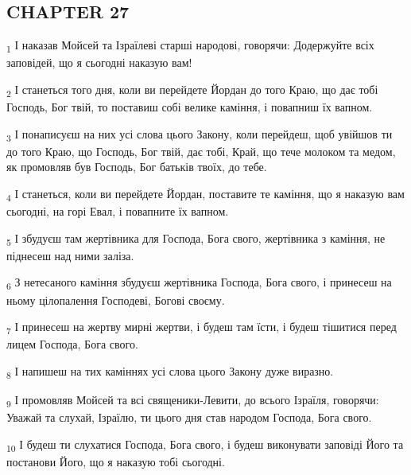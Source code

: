 \subsection{CHAPTER 27}
\begin{tcolorbox}
\textsubscript{1} І наказав Мойсей та Ізраїлеві старші народові, говорячи: Додержуйте всіх заповідей, що я сьогодні наказую вам!
\end{tcolorbox}
\begin{tcolorbox}
\textsubscript{2} І станеться того дня, коли ви перейдете Йордан до того Краю, що дає тобі Господь, Бог твій, то поставиш собі велике каміння, і повапниш їх вапном.
\end{tcolorbox}
\begin{tcolorbox}
\textsubscript{3} І понаписуєш на них усі слова цього Закону, коли перейдеш, щоб увійшов ти до того Краю, що Господь, Бог твій, дає тобі, Край, що тече молоком та медом, як промовляв був Господь, Бог батьків твоїх, до тебе.
\end{tcolorbox}
\begin{tcolorbox}
\textsubscript{4} І станеться, коли ви перейдете Йордан, поставите те каміння, що я наказую вам сьогодні, на горі Евал, і повапните їх вапном.
\end{tcolorbox}
\begin{tcolorbox}
\textsubscript{5} І збудуєш там жертівника для Господа, Бога свого, жертівника з каміння, не піднесеш над ними заліза.
\end{tcolorbox}
\begin{tcolorbox}
\textsubscript{6} З нетесаного каміння збудуєш жертівника Господа, Бога свого, і принесеш на ньому цілопалення Господеві, Богові своєму.
\end{tcolorbox}
\begin{tcolorbox}
\textsubscript{7} І принесеш на жертву мирні жертви, і будеш там їсти, і будеш тішитися перед лицем Господа, Бога свого.
\end{tcolorbox}
\begin{tcolorbox}
\textsubscript{8} І напишеш на тих каміннях усі слова цього Закону дуже виразно.
\end{tcolorbox}
\begin{tcolorbox}
\textsubscript{9} І промовляв Мойсей та всі священики-Левити, до всього Ізраїля, говорячи: Уважай та слухай, Ізраїлю, ти цього дня став народом Господа, Бога свого.
\end{tcolorbox}
\begin{tcolorbox}
\textsubscript{10} І будеш ти слухатися Господа, Бога свого, і будеш виконувати заповіді Його та постанови Його, що я наказую тобі сьогодні.
\end{tcolorbox}
